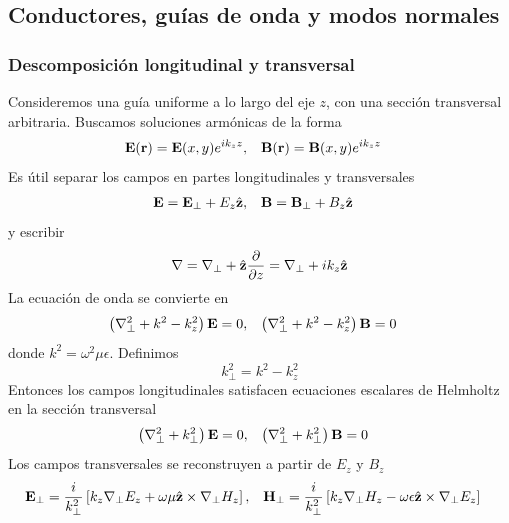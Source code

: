 \documentclass[]{article}
\numberwithin{equation}{section}
\begin{document}
\subsection{Conductores, guías de onda y modos normales}
\subsubsection{Descomposición longitudinal y transversal}
Consideremos una guía uniforme a lo largo del eje $z$, con una sección transversal arbitraria. Buscamos soluciones armónicas de la forma
\begin{align}
	\mathbf{E}(\mathbf{r}) &= \mathbf{E}(x,y) e^{i k_z z}, & \mathbf{B}(\mathbf{r}) &= \mathbf{B}(x,y)e^{i k_z z}
\end{align}
Es útil separar los campos en partes longitudinales y transversales
\begin{align}
	\mathbf{E} &= \mathbf{E}_\perp + E_z\hat{\mathbf{z}}, & \mathbf{B} &= \mathbf{B}_\perp + B_z\hat{\mathbf{z}}
\end{align}
y escribir
\begin{equation}
	\nabla = \nabla_\perp + \hat{\mathbf{z}}\dfrac{\partial }{\partial z} = \nabla_\perp + i k_z \hat{\mathbf{z}}
\end{equation}
La ecuación de onda se convierte en
\begin{align}
	\left(\nabla^2_\perp + k^2 - k_z^2\right) \mathbf{E} &= 0, & \left(\nabla^2_\perp + k^2 - k_z^2\right) \mathbf{B} &= 0
\end{align}
donde $k^2=\omega^2\mu\epsilon$. Definimos
\begin{equation}
	k_\perp^2 = k^2 - k_z^2
\end{equation}
Entonces los campos longitudinales satisfacen ecuaciones escalares de Helmholtz en la sección transversal
\begin{align}
	\left(\nabla^2_\perp + k_\perp^2\right) \mathbf{E} &= 0, & \left(\nabla^2_\perp + k_\perp^2\right) \mathbf{B} &= 0
\end{align}
Los campos transversales se reconstruyen a partir de $E_z$ y $B_z$
\begin{align}
	\mathbf{E}_\perp &= \frac{i}{k_\perp^2}\left[k_z\nabla_\perp E_z + \omega\mu\hat{\mathbf{z}}\times\nabla_\perp H_z\right], & \mathbf{H}_\perp &= \frac{i}{k_\perp^2}\left[k_z\nabla_\perp H_z - \omega\epsilon\hat{\mathbf{z}}\times\nabla_\perp E_z\right]
\end{align}
\end{document}

